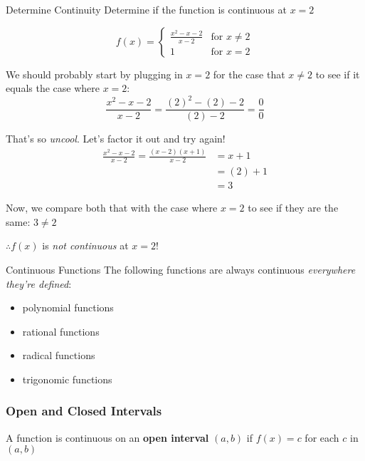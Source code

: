 \documentclass{MathNotes}
\begin{document}
\begin{example}{Determine Continuity}
    Determine if the function is continuous at $x=2$

    \begin{displaymath}
        f(x) = \begin{cases}
            \frac{x^2-x-2}{x-2} &\text{for } x\neq 2\\
            1 &\text{for } x=2
        \end{cases}
    \end{displaymath}
    \br

    We should probably start by plugging in $x=2$ for the case that
    $x\neq2$ to see if it equals the case where $x=2$:
    \begin{displaymath}
        \frac{x^2-x-2}{x-2}=\frac{(2)^2-(2)-2}{(2)-2}=\frac{0}{0}
    \end{displaymath}

    That's so \textit{uncool}. Let's factor it out and try again!
    \begin{align*}
        \frac{x^2-x-2}{x-2} = \frac{(x-2)(x+1)}{x-2} &= x+1\\
        &=(2)+1\\
        &=3
    \end{align*}

    Now, we compare both that with the case where $x=2$ to see if they
    are the same: $3\neq2$

    $\therefore f(x)$ is \textit{not continuous} at $x=2$!

\end{example}
\newpage

\begin{note}{Continuous Functions}
    The following functions are always continuous \textit{everywhere
    they're defined}:
    \begin{itemize}
        \item polynomial functions
        \item rational functions
        \item radical functions
        \item trigonomic functions
    \end{itemize}
\end{note}

\subsubsection{Open and Closed Intervals}\label{sec:1.4.1}
A function is continuous on an \textbf{open interval} $(a, b)$ if
$f(x)=c$ for each $c$ in $(a, b)$
\end{document}
